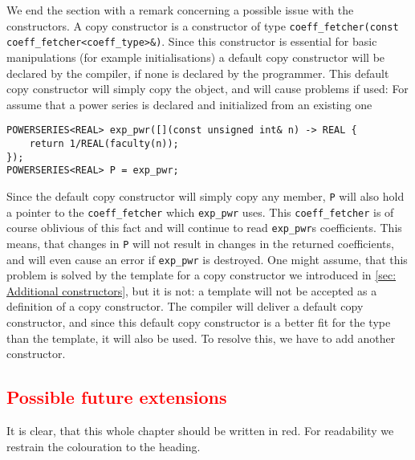 \documentclass{article}
\newcommand{\code}[1]{\texttt{#1}}
\newcommand{\temp}[1]{\textcolor{red}{#1}}
\begin{document}
We end the section with a remark concerning a possible issue with the constructors. A copy constructor is a constructor of type \code{coeff\_fetcher(const coeff\_fetcher<coeff\_type>\&)}. Since this constructor is essential for basic manipulations (for example initialisations) a default copy constructor will be declared by the compiler, if none is declared by the programmer. This default copy constructor will simply copy the object, and will cause problems if used: For assume that a power series is declared and initialized from an existing one
\begin{lstlisting}
POWERSERIES<REAL> exp_pwr([](const unsigned int& n) -> REAL {
	return 1/REAL(faculty(n));
});
POWERSERIES<REAL> P = exp_pwr;
\end{lstlisting}
Since the default copy constructor will simply copy any member, \code{P} will also hold a pointer to the \code{coeff\_fetcher} which \code{exp\_pwr} uses. This \code{coeff\_fetcher} is of course oblivious of this fact and will continue to read \code{exp\_pwr}s coefficients. This means, that changes in \code{P} will not result in changes in the returned coefficients, and will even cause an error if \code{exp\_pwr} is destroyed. One might assume, that this problem is solved by the template for a copy constructor we introduced in \cref{sec: Additional constructors}, but it is not: a template will not be accepted as a definition of a copy constructor. The compiler will deliver a default copy constructor, and since this default copy constructor is a better fit for the type than the template, it will also be used. To resolve this, we have to add another constructor.

\subsection{\temp{Possible future extensions}}

It is clear, that this whole chapter should be written in red. For readability we restrain the colouration to the heading.
\newpage

{}

\end{document}
